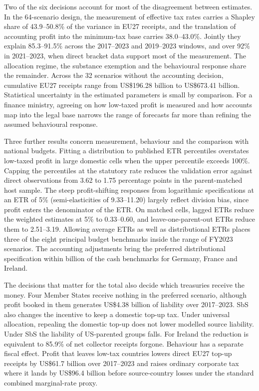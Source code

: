 \documentclass[11pt,a4paper]{article}
\newcommand{\EUR}{\texteuro}
\newcommand{\usd}{US\$}
\begin{document}
Two of the six decisions account for most of the disagreement between estimates. In the 64-scenario design, the measurement of effective tax rates carries a Shapley share of 43.9–50.8\% of the variance in EU27 receipts, and the translation of accounting profit into the minimum-tax base carries 38.0–43.0\%. Jointly they explain 85.3–91.5\% across the 2017–2023 and 2019–2023 windows, and over 92\% in 2021–2023, when direct bracket data support most of the measurement. The allocation regime, the substance exemption and the behavioural response share the remainder. Across the 32 scenarios without the accounting decision, cumulative EU27 receipts range from \usd196.28 billion to \usd673.41 billion. Statistical uncertainty in the estimated parameters is small by comparison. For a finance ministry, agreeing on how low-taxed profit is measured and how accounts map into the legal base narrows the range of forecasts far more than refining the assumed behavioural response.

Three further results concern measurement, behaviour and the comparison with national budgets. Fitting a distribution to published ETR percentiles overstates low-taxed profit in large domestic cells when the upper percentile exceeds 100\%. Capping the percentiles at the statutory rate reduces the validation error against direct observations from 3.62 to 1.75 percentage points in the parent-matched host sample. The steep profit-shifting responses from logarithmic specifications at an ETR of 5\% (semi-elasticities of 9.33–11.20) largely reflect division bias, since profit enters the denominator of the ETR. On matched cells, lagged ETRs reduce the weighted estimates at 5\% to 0.33–0.60, and leave-one-parent-out ETRs reduce them to 2.51–3.19. Allowing average ETRs as well as distributional ETRs places three of the eight principal budget benchmarks inside the range of FY2023 scenarios. The accounting adjustments bring the preferred distributional specification within \EUR0.5 billion of the cash benchmarks for Germany, France and Ireland.

The decisions that matter for the total also decide which treasuries receive the money. Four Member States receive nothing in the preferred scenario, although profit booked in them generates \usd4.38 billion of liability over 2017–2023. SbS also changes the incentive to keep a domestic top-up tax. Under universal allocation, repealing the domestic top-up does not lower modelled source liability. Under SbS the liability of US-parented groups falls. For Ireland the reduction is equivalent to 85.9\% of net collector receipts forgone. Behaviour has a separate fiscal effect. Profit that leaves low-tax countries lowers direct EU27 top-up receipts by \usd61.7 billion over 2017–2023 and raises ordinary corporate tax where it lands by \usd96.4 billion before source-country losses under the standard combined marginal-rate proxy.
\end{document}
